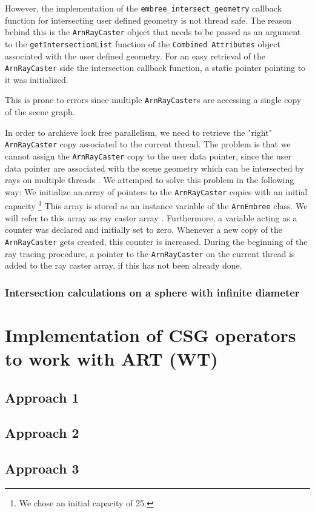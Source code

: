 However, the implementation of the \texttt{embree\_intersect\_geometry} callback function for intersecting user defined geometry is not thread safe. The reason behind this is the \texttt{ArnRayCaster} object that needs to be passed as an argument to the \texttt{getIntersectionList} function of the \texttt{Combined Attributes} object associated with the user defined geometry. 
For an easy retrieval of the \texttt{ArnRayCaster} side the intersection callback function, a static pointer pointing to it was initialized. 

This is prone to errors  since multiple \texttt{ArnRayCaster}s are accessing a single copy of the scene graph. 

In order to archieve lock free parallelism, we need to retrieve the "right" \texttt{ArnRayCaster} copy associated to the current thread. The problem is that  we cannot assign the \texttt{ArnRayCaster} copy to the user data pointer, since the user data pointer are associated with the scene geometry which can be intersected by rays on multiple threads .
We attemped to solve this problem in the following way: We initialize an array of pointers to the \texttt{ArnRayCaster} copies with an initial capacity \footnote{We chose an initial capacity of 25.} This array is stored as an instance variable of the \texttt{ArnEmbree} class. We will refer to this array as ray caster array . Furthermore, a variable acting as a counter was declared and initially set to zero. Whenever a new copy of the \texttt{ArnRayCaster} gets created, this counter is increased. 
During the beginning of the ray tracing procedure, a pointer to the \texttt{ArnRayCaster} on the current thread is added to the ray caster array, if this has not been already done.

\subsubsection{Intersection calculations on a sphere with infinite diameter}



\section{Implementation of CSG operators to work with ART (WT)}
\label{sec:embree_csg}
\subsection{Approach 1}
\subsection{Approach 2}
\subsection{Approach 3}
